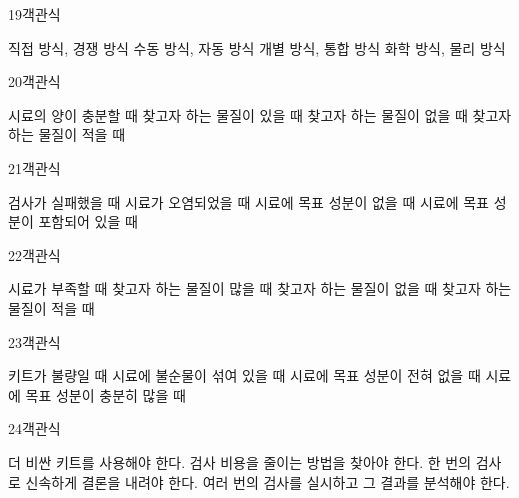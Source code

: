 \documentclass[fs9,seriesRus]{korfarm-base}
\begin{document}
\begin{kfQBlock}{19}{객관식}
\begin{kfChoices}
\kfChoice 직접 방식, 경쟁 방식
\kfChoice 수동 방식, 자동 방식
\kfChoice 개별 방식, 통합 방식
\kfChoice 화학 방식, 물리 방식
\end{kfChoices}
\end{kfQBlock}
\begin{kfQBlock}{20}{객관식}
\begin{kfChoices}
\kfChoice 시료의 양이 충분할 때
\kfChoice 찾고자 하는 물질이 있을 때
\kfChoice 찾고자 하는 물질이 없을 때
\kfChoice 찾고자 하는 물질이 적을 때
\end{kfChoices}
\end{kfQBlock}
\begin{kfQBlock}{21}{객관식}
\begin{kfChoices}
\kfChoice 검사가 실패했을 때
\kfChoice 시료가 오염되었을 때
\kfChoice 시료에 목표 성분이 없을 때
\kfChoice 시료에 목표 성분이 포함되어 있을 때
\end{kfChoices}
\end{kfQBlock}
\begin{kfQBlock}{22}{객관식}
\begin{kfChoices}
\kfChoice 시료가 부족할 때
\kfChoice 찾고자 하는 물질이 많을 때
\kfChoice 찾고자 하는 물질이 없을 때
\kfChoice 찾고자 하는 물질이 적을 때
\end{kfChoices}
\end{kfQBlock}
\begin{kfQBlock}{23}{객관식}
\begin{kfChoices}
\kfChoice 키트가 불량일 때
\kfChoice 시료에 불순물이 섞여 있을 때
\kfChoice 시료에 목표 성분이 전혀 없을 때
\kfChoice 시료에 목표 성분이 충분히 많을 때
\end{kfChoices}
\end{kfQBlock}
\begin{kfQBlock}{24}{객관식}
\begin{kfChoices}
\kfChoice 더 비싼 키트를 사용해야 한다.
\kfChoice 검사 비용을 줄이는 방법을 찾아야 한다.
\kfChoice 한 번의 검사로 신속하게 결론을 내려야 한다.
\kfChoice 여러 번의 검사를 실시하고 그 결과를 분석해야 한다.
\end{kfChoices}
\end{kfQBlock}
\end{document}
